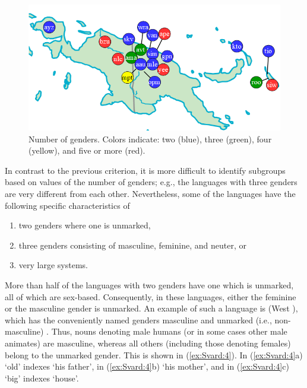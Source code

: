 \documentclass[output=collectionpaper]{langsci/langscibook}
\begin{document}
\begin{figure}
\includegraphics[width=\textwidth]{figures/09/Simple/fig3.png}
\caption{Number of genders. Colors indicate: two (blue), three (green), four (yellow), and five or more (red).}
\label{fig:Svard:3}
\end{figure}



In contrast to the previous criterion, it is more difficult to identify subgroups based on values of the number of genders; e.g., the languages with three genders are very different from each other. Nevertheless, some of the languages have the following specific characteristics of

\begin{enumerate}
\item two genders where one is unmarked,
\item three genders consisting of masculine, feminine, and neuter, or
\item very large systems.
\end{enumerate}

More than half of the languages with two genders have one which is unmarked, all of which are sex-based. Consequently, in these languages, either the feminine or the masculine gender is unmarked. An example of such a language is  (West ), which has the conveniently named genders masculine and unmarked (i.e., non-masculine) \citep[89]{Dol2007}. Thus, nouns denoting male humans (or in some cases other male animates) are masculine, whereas all others (including those denoting females) belong to the unmarked gender. This is shown in (\ref{ex:Svard:4}). In (\ref{ex:Svard:4}a) `old' indexes `his father', in (\ref{ex:Svard:4}b) `his mother', and in (\ref{ex:Svard:4}c) `big' indexes `house'.
\end{document}
